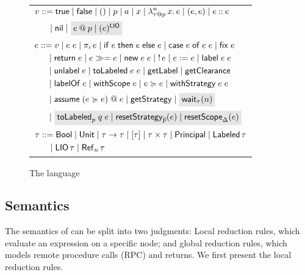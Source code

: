 \begin{figure}
    \centering
    \begin{tabular}{l}
         $\begin{aligned}[t]
         \val &::= \true \mid \false \mid () \mid p \mid \addr \mid x \mid \abs{n}{\lb{p}{\type}}{x}{\expr} \mid (\expr, \expr) \mid \cons{\expr}{\expr} \\
         &\quad \mid \nil \mid \graybox{\lb{p}{\expr} \mid \lio{\expr}}
         \end{aligned}$ \\
         $\begin{aligned}[t]
         \expr &::= \val \mid \app{\expr}{\expr} \mid \proj{i}{\expr} \mid \ifexpr{\expr}{\expr}{\expr} \mid \case{\expr}{\expr}{\expr} \mid \fix{\expr} \\ &\quad \mid \return{\expr} \mid \bind{\expr}{\expr} \mid
         \new{\expr}{\expr} \mid \readref{\expr} \mid \writeref{\expr}{\expr} \mid \Label{\expr}{\expr} \\ &\quad
         \mid \unlabel{\expr} \mid
         \tolabeled{\expr}{\expr} \mid \getlabel \mid \getclearance \\ &\quad
         \mid \labelof{\expr} \mid \withscope{\expr} \mid \expr \actsfor \expr \mid \withstrategy{\expr}{\expr} \\ &\quad \mid \adddelegate{\expr}{\expr}{\expr} \mid \getstrategy
         \mid \graybox{\wait{n}[\type]} \\ &\quad
         \mid \graybox{\internalTolabeled{p}{q}{\expr} \mid \resetstrategy{\overline{p}}{\expr} \mid \resetscope{\scope}{\expr}}
         \end{aligned}$ \\
         $\begin{aligned}[t]
         \type &::= \bool \mid \unit \mid \func{\type}{\type} \mid \listtype{\type} \mid \pair{\type}{\type} \mid \labeltype \mid \labeled{\type} \\ &\quad
         \mid \liotype{\type} \mid \reftype[n]{\type}
         \end{aligned}$
    \end{tabular}
    \caption{The \lang{} language}
    \label{fig:language-syntax}
\end{figure}

\subsection{Semantics}\label{sec:semantics}
The semantics of \lang{} can be split into two judgments: Local reduction rules, which evaluate an expression on a specific node; and global reduction rules, which models remote procedure calls (RPC) and returns. We first present the local reduction rules.

